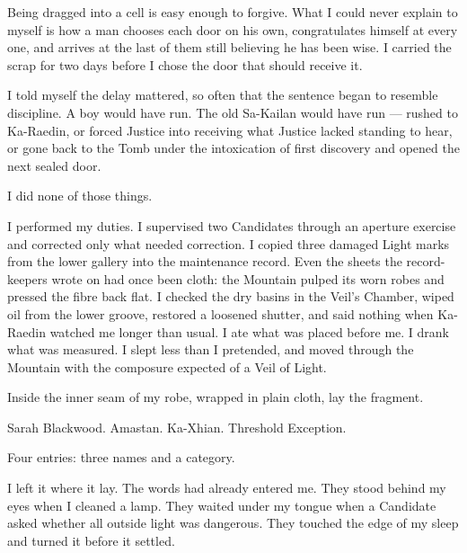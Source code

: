 
Being dragged into a cell is easy enough to forgive. What I could never explain to myself is how a man chooses each door on his own, congratulates himself at every one, and arrives at the last of them still believing he has been wise. I carried the scrap for two days before I chose the door that should receive it.\par

\ornament

I told myself the delay mattered, so often that the sentence began to resemble discipline. A boy would have run. The old Sa-Kailan would have run --- rushed to Ka-Raedin, or forced Justice into receiving what Justice lacked standing to hear, or gone back to the Tomb under the intoxication of first discovery and opened the next sealed door.\par

I did none of those things.\par

I performed my duties. I supervised two Candidates through an aperture exercise and corrected only what needed correction. I copied three damaged Light marks from the lower gallery into the maintenance record. Even the sheets the record-keepers wrote on had once been cloth: the Mountain pulped its worn robes and pressed the fibre back flat. I checked the dry basins in the Veil's Chamber, wiped oil from the lower groove, restored a loosened shutter, and said nothing when Ka-Raedin watched me longer than usual. I ate what was placed before me. I drank what was measured. I slept less than I pretended, and moved through the Mountain with the composure expected of a Veil of Light.\par

Inside the inner seam of my robe, wrapped in plain cloth, lay the fragment.\par

Sarah Blackwood. Amastan. Ka-Xhian. Threshold Exception.\par

Four entries: three names and a category.\par

I left it where it lay. The words had already entered me. They stood behind my eyes when I cleaned a lamp. They waited under my tongue when a Candidate asked whether all outside light was dangerous. They touched the edge of my sleep and turned it before it settled.\par

